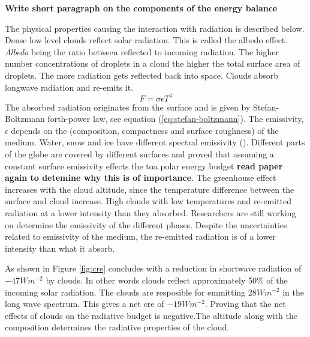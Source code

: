 \textbf{Write short paragraph on the components of the energy balance}

The physical properties causing the interaction with radiation is described below. Dense low level clouds reflect solar radiation. This is called the albedo effect. \textit{Albedo} being the ratio between reflected to incoming radiation. The higher number concentrations of droplets in a cloud the higher the total surface area of droplets. The more radiation gets reflected back into space. Clouds absorb longwave radiation and re-emits it. 
\begin{equation} \label{eq:stefan-boltzmann}
    F = \sigma \epsilon T ^4
\end{equation}
The absorbed radiation originates from the surface and is given by Stefan-Boltzmann forth-power law, see equation (\ref{eq:stefan-boltzmann}). The emissivity, $\epsilon$ depends on the (composition, compactness and surface roughness) of the medium. Water, snow and ice have different spectral emissivity (\cite{Huang2018ImprovedClimate}). Different parts of the globe are covered by different surfaces and \citeauthor{Huang2016AnSimulations} proved that assuming a constant surface emissivity effects the \acrfull{toa} polar energy budget \textbf{read paper again to detemine why this is of importance}. The greenhouse effect increases with the cloud altitude, since the temperature difference between the surface and cloud increase. High clouds with low temperatures and  re-emitted radiation at a lower intensity than they absorbed. Researchers are still working on determine the emissivity of the different phases. Despite the uncertainties related to emissivity of the medium, the re-emitted radiation is of a lower intensity than what it absorb.



As shown in Figure \ref{fig:cre} \citeauthor{Wild2019TheModels} concludes with a reduction in shortwave radiation of $-47Wm^{-2}$ by clouds. In other words clouds reflect approximately 50\% of the incoming solar radiation. The clouds are resposible for emmitting $28Wm^{-2}$ in the long wave spectrum. This gives a net \acrshort{cre} of $-19Wm^{-2}$. Proving that the net effects of clouds on the radiative budget is negative.The altitude along with the composition determines the radiative properties of the cloud. 




